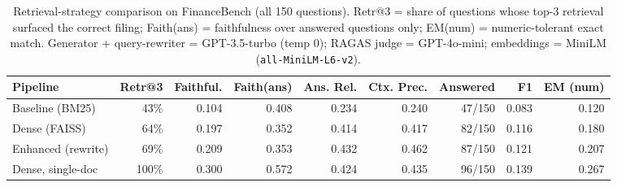 \begin{table}[t]
\centering
\small
\caption{Retrieval-strategy comparison on FinanceBench (all 150 questions). Retr@3 = share of questions whose top-3 retrieval surfaced the correct filing; Faith(ans) = faithfulness over answered questions only; EM(num) = numeric-tolerant exact match. Generator + query-rewriter = GPT-3.5-turbo (temp 0); RAGAS judge = GPT-4o-mini; embeddings = MiniLM (\texttt{all-MiniLM-L6-v2}).}
\label{tab:pipeline-comparison}
\begin{tabular}{lrrrrrrrr}
\toprule
Pipeline & Retr@3 & Faithful. & Faith(ans) & Ans. Rel. & Ctx. Prec. & Answered & F1 & EM (num) \\
\midrule
Baseline (BM25) & 43\% & 0.104 & 0.408 & 0.234 & 0.240 & 47/150 & 0.083 & 0.120 \\
Dense (FAISS) & 64\% & 0.197 & 0.352 & 0.414 & 0.417 & 82/150 & 0.116 & 0.180 \\
Enhanced (rewrite) & 69\% & 0.209 & 0.353 & 0.432 & 0.462 & 87/150 & 0.121 & 0.207 \\
Dense, single-doc & 100\% & 0.300 & 0.572 & 0.424 & 0.435 & 96/150 & 0.139 & 0.267 \\
\bottomrule
\end{tabular}
\end{table}
